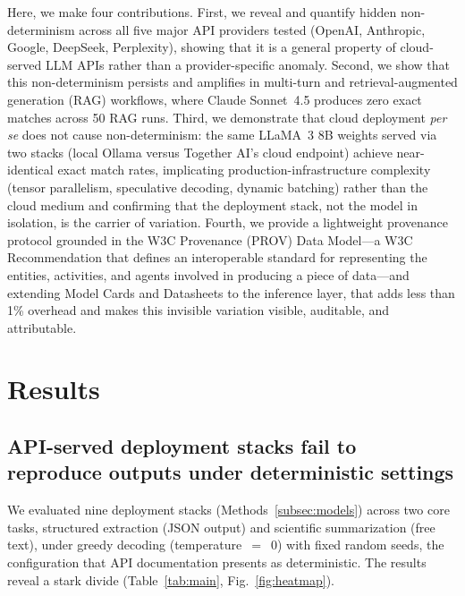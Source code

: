 \documentclass[sn-nature]{sn-jnl}
\begin{document}
Here, we make four contributions.
First, we reveal and quantify hidden non-determinism across all five major API providers tested (OpenAI, Anthropic, Google, DeepSeek, Perplexity), showing that it is a general property of cloud-served LLM APIs rather than a provider-specific anomaly.
Second, we show that this non-determinism persists and amplifies in multi-turn and retrieval-augmented generation (RAG) workflows, where Claude Sonnet~4.5 produces zero exact matches across 50 RAG runs.
Third, we demonstrate that cloud deployment \emph{per se} does not cause non-determinism: the same LLaMA~3 8B weights served via two stacks (local Ollama versus Together AI's cloud endpoint) achieve near-identical exact match rates, implicating production-infrastructure complexity (tensor parallelism, speculative decoding, dynamic batching) rather than the cloud medium and confirming that the deployment stack, not the model in isolation, is the carrier of variation.
Fourth, we provide a lightweight provenance protocol grounded in the W3C Provenance (PROV) Data Model\cite{w3cprov2013}---a W3C Recommendation that defines an interoperable standard for representing the entities, activities, and agents involved in producing a piece of data---and extending Model Cards\cite{mitchell2019model} and Datasheets\cite{gebru2021datasheets} to the inference layer, that adds less than 1\% overhead and makes this invisible variation visible, auditable, and attributable.


\section{Results}\label{sec:results}

\subsection{API-served deployment stacks fail to reproduce outputs under deterministic settings}\label{subsec:greedy}

We evaluated nine deployment stacks (Methods~\ref{subsec:models}) across two core tasks, structured extraction (JSON output) and scientific summarization (free text), under greedy decoding (temperature~$=$~0) with fixed random seeds, the configuration that API documentation presents as deterministic.
The results reveal a stark divide (Table~\ref{tab:main}, Fig.~\ref{fig:heatmap}).
\end{document}

